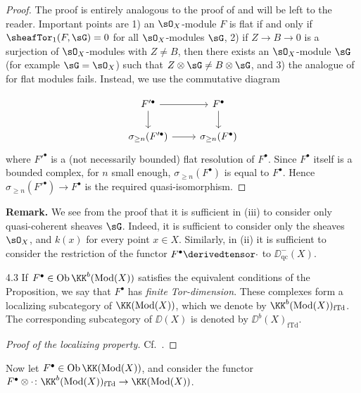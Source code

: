 \begin{proof}
The proof is entirely analogous to the proof of  and will be left to the reader. Important points are 1) an $\sO_X$-module $F$ is flat if and only if $\sheafTor_1(F,\sG)=0$ for all $\sO_X$-modules $\sG$, 2) if $Z\to B\to 0$ is a surjection of $\sO_X$-modules with $Z\neq B$, then there exists an $\sO_X$-module $\sG$ (for example $\sG=\sO_X$) such that $Z\otimes\sG\neq B\otimes\sG$, and 3) the analogue of  for flat modules fails. Instead, we use the commutative diagram

\[
\begin{tikzcd}
F'^\bullet \arrow[r] \arrow[d] & F^\bullet \arrow[d] \\
\sigma_{\ge n}(F'^\bullet) \arrow[r] & \sigma_{\ge n}(F^\bullet)
\end{tikzcd}
\]
where $F'^\bullet$ is a (not necessarily bounded) flat resolution of $F^\bullet$. Since $F^\bullet$ itself is a bounded complex, for $n$ small enough, $\sigma_{\ge n}(F^\bullet)$ is equal to $F^\bullet$. Hence $\sigma_{\ge n}(F'^\bullet)\to F^\bullet$ is the required quasi-isomorphism.
\end{proof}

\textbf{Remark.}
We see from the proof that it is sufficient in (iii) to consider only quasi-coherent sheaves $\sG$. Indeed, it is sufficient to consider only the sheaves $\sO_X$, and $k(x)$ for every point $x\in X$. Similarly, in (ii) it is sufficient to consider the restriction of the functor $F^\bullet\derivedtensor\cdot$ to $\DD_{\mathrm{qc}}^-(X)$.

\begin{bookdefinitioncorollary}{4.3}\label{defcor:2.4.3}
If $F^\bullet\in\operatorname{Ob}\KK^b(\operatorname{Mod}(X))$ satisfies the equivalent conditions of the Proposition, we say that $F^\bullet$ has \emph{finite Tor-dimension}. These complexes form a localizing subcategory of $\KK(\operatorname{Mod}(X))$, which we denote by $\KK^b(\operatorname{Mod}(X))_{\mathrm{fTd}}$. The corresponding subcategory of $\DD(X)$ is denoted by $\DD^b(X)_{\mathrm{fTd}}$.
\end{bookdefinitioncorollary}

\begin{proof}[Proof of the localizing property]
Cf.\ .
\end{proof}

Now let $F^\bullet\in\operatorname{Ob}\KK(\operatorname{Mod}(X))$, and consider the functor $F^\bullet\otimes\cdot\colon \KK^b(\operatorname{Mod}(X))_{\mathrm{fTd}}\to\KK(\operatorname{Mod}(X))$.

